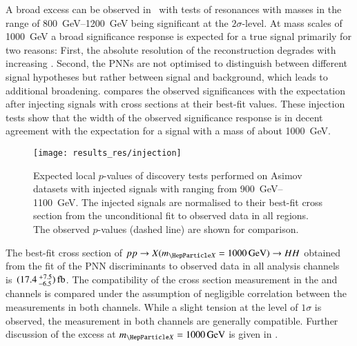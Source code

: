 A broad excess can be observed in~ with tests of
resonances with masses in the range of \SIrange{800}{1200}{\GeV} being
significant at the $2\sigma$-level. At mass scales of \SI{1000}{\GeV} a broad
significance response is expected for a true signal primarily for two reasons:
First, the absolute resolution of the \mHH reconstruction degrades with
increasing \mX. Second, the PNNs are not optimised to distinguish between
different signal hypotheses but rather between signal and background, which
leads to additional broadening.  compares the
observed significances with the expectation after injecting signals with cross
sections at their best-fit values. These injection tests show that the width of
the observed significance response is in decent agreement with the expectation
for a signal with a mass of about \SI{1000}{\GeV}.

\begin{figure}[htbp]
  \centering

  \texttt{[image: results\_res/injection]}

  \caption[Expected local $p$-values of discovery tests performed on Asimov
  dataset with injected signals.]{Expected local $p$-values of discovery tests
    performed on Asimov datasets with injected signals with \mX ranging from
    \SIrange{900}{1100}{\GeV}. The injected signals are normalised to their
    best-fit cross section from the unconditional fit to observed data in all
    regions. The observed $p$-values (dashed line) are shown for comparison.}%
  \label{fig:local_pvalues_injected}
\end{figure}

The best-fit cross section of $pp \to X(\mX = \SI{1000}{\GeV}) \to HH$ obtained
from the fit of the PNN discriminants to observed data in all analysis channels
is~$(\num{17.4}\valuesep^{\hspace{0.25pt}+\hspace{0.25pt}7.5}_{-6.5})\valuesep\si{\femto\barn}$. The
compatibility of the cross section measurement in the \hadhad and \lephad
channels is compared under the assumption of negligible correlation between the
measurements in both channels.
While a slight tension at the level of $1\sigma$ is observed, the measurement in
both channels are generally compatible. Further discussion of the excess at
$\mX = \SI{1000}{\GeV}$ is given in
.

